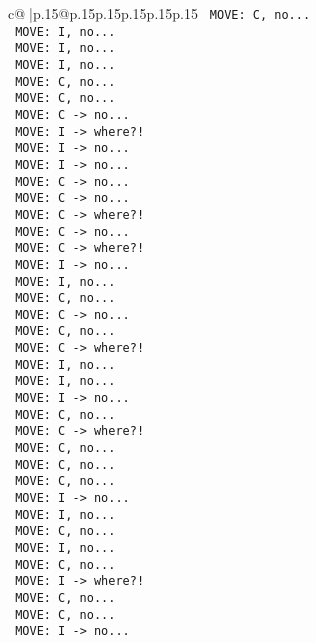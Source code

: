 \documentclass{article}
\begin{document}
{\begin{supertabular}{c@{$\;$}|p{.15\linewidth}@{}p{.15\linewidth}p{.15\linewidth}p{.15\linewidth}p{.15\linewidth}p{.15\linewidth}}
{{{\texttt{ MOVE: C, no...} \\
\texttt{ MOVE: I, no...} \\
\texttt{ MOVE: I, no...} \\
\texttt{ MOVE: I, no...} \\
\texttt{ MOVE: C, no...} \\
\texttt{ MOVE: C, no...} \\
\texttt{ MOVE: C {-}> no...} \\
\texttt{ MOVE: I {-}> where?!} \\
\texttt{ MOVE: I {-}> no...} \\
\texttt{ MOVE: I {-}> no...} \\
\texttt{ MOVE: C {-}> no...} \\
\texttt{ MOVE: C {-}> no...} \\
\texttt{ MOVE: C {-}> where?!} \\
\texttt{ MOVE: C {-}> no...} \\
\texttt{ MOVE: C {-}> where?!} \\
\texttt{ MOVE: I {-}> no...} \\
\texttt{ MOVE: I, no...} \\
\texttt{ MOVE: C, no...} \\
\texttt{ MOVE: C {-}> no...} \\
\texttt{ MOVE: C, no...} \\
\texttt{ MOVE: C {-}> where?!} \\
\texttt{ MOVE: I, no...} \\
\texttt{ MOVE: I, no...} \\
\texttt{ MOVE: I {-}> no...} \\
\texttt{ MOVE: C, no...} \\
\texttt{ MOVE: C {-}> where?!} \\
\texttt{ MOVE: C, no...} \\
\texttt{ MOVE: C, no...} \\
\texttt{ MOVE: C, no...} \\
\texttt{ MOVE: I {-}> no...} \\
\texttt{ MOVE: I, no...} \\
\texttt{ MOVE: C, no...} \\
\texttt{ MOVE: I, no...} \\
\texttt{ MOVE: C, no...} \\
\texttt{ MOVE: I {-}> where?!} \\
\texttt{ MOVE: C, no...} \\
\texttt{ MOVE: C, no...} \\
\texttt{ MOVE: I {-}> no...} \\
}}}
\end{supertabular}}
\end{document}
